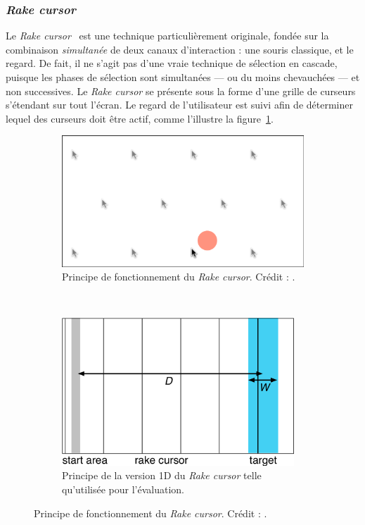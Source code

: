 	
	\subsubsection{\emph{Rake cursor}}
	Le \emph{Rake cursor}~\cite{blanch2009rake} est une technique particulièrement originale, fondée sur la combinaison \emph{simultanée} de deux canaux d'interaction : une souris classique, et le regard. De fait, il ne s'agit pas d'une \og vraie \fg{} technique de sélection en cascade, puisque les phases de sélection sont simultanées --- ou du moins chevauchées --- et non successives. Le \emph{Rake cursor} se présente sous la forme d'une grille de curseurs s'étendant sur tout l'écran. Le regard de l'utilisateur est suivi afin de déterminer lequel des curseurs doit être actif, comme l'illustre la figure~\ref{fig:rakeCursor2d}.
	
	\begin{figure}[!htbp]
		\begin{subfigure}[t]{0.52\textwidth}
			\centering
			\includegraphics[width=\textwidth]{figures/ch2/rakeCursor}
			\caption{Principe de fonctionnement du \emph{Rake cursor}. Crédit : \cite{blanch2009rake}.}
			\label{fig:rakeCursor2d}
		\end{subfigure}
		~
		\begin{subfigure}[t]{0.46\textwidth}
			\centering
			\includegraphics[width=0.96\textwidth]{figures/ch2/rakeCursor1d}
			\caption{Principe de la version 1D du \emph{Rake cursor} telle qu'utilisée pour l'évaluation.}
			\label{fig:rakeCursor1d}
		\end{subfigure}
			\caption{Principe de fonctionnement du \emph{Rake cursor}. Crédit : \cite{blanch2009rake}.}
		\label{fig:rakeCursor}
	\end{figure}
	
